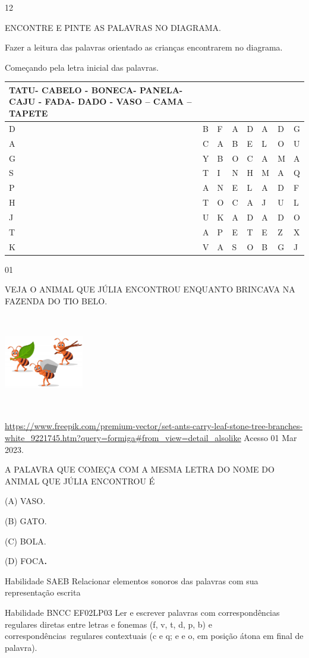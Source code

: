 {\num{12}

ENCONTRE E PINTE AS PALAVRAS NO DIAGRAMA.

Fazer a leitura das palavras orientado as crianças encontrarem no
diagrama.

Começando pela letra inicial das palavras.

\begin{longtable}[]{@{}llllllll@{}}
\toprule
TATU- CABELO - BONECA- PANELA- CAJU - FADA- DADO - VASO -- CAMA --
TAPETE\tabularnewline
\midrule
\endhead
D & B & F & A & D & A & D & G\tabularnewline
A & C & A & B & E & L & O & U\tabularnewline
G & Y & B & O & C & A & M & A\tabularnewline
S & T & I & N & H & M & A & Q\tabularnewline
P & A & N & E & L & A & D & F\tabularnewline
H & T & O & C & A & J & U & L\tabularnewline
J & U & K & A & D & A & D & O\tabularnewline
T & A & P & E & T & E & Z & X\tabularnewline
K & V & A & S & O & B & G & J\tabularnewline
\bottomrule
\end{longtable}

\protect\hypertarget{_Hlk128550489}{}{}


\num{01}

VEJA O ANIMAL QUE JÚLIA ENCONTROU ENQUANTO BRINCAVA NA FAZENDA DO TIO
BELO.

\includegraphics[width=1.36528in,height=1.64861in]{media/image42.jpeg}

\url{https://www.freepik.com/premium-vector/set-ants-carry-leaf-stone-tree-branches-white_9221745.htm?query=formiga\#from_view=detail_alsolike}
Acesso 01 Mar 2023.

A PALAVRA QUE COMEÇA COM A MESMA LETRA DO NOME DO ANIMAL QUE JÚLIA
ENCONTROU É

(A) VASO.

(B) GATO.

(C) BOLA.

(D) FOCA\textbf{.}

Habilidade SAEB Relacionar elementos sonoros das palavras com sua
representação escrita

Habilidade BNCC EF02LP03 Ler e escrever palavras com correspondências
regulares diretas entre letras e fonemas (f, v, t, d, p, b) e
correspondências~regulares contextuais (c e q; e e o, em posição átona
em final de palavra).

}
